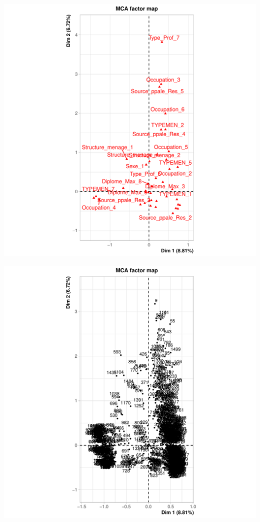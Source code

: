 \documentclass[11pt,a4paper, x11names]{article}\usepackage[]{graphicx}\usepackage[]{color}
\makeatletter
\def\maxwidth{ %
  \ifdim\Gin@nat@width>\linewidth
    \linewidth
  \else
    \Gin@nat@width
  \fi
}
\newenvironment{knitrout}{}{} %
\makeatother
\begin{document}
\begin{knitrout}
\color{fgcolor}
\includegraphics[width=\maxwidth]{figure/unnamed-chunk-9-1} 

\includegraphics[width=\maxwidth]{figure/unnamed-chunk-9-2} 


\end{knitrout}
\end{document}
